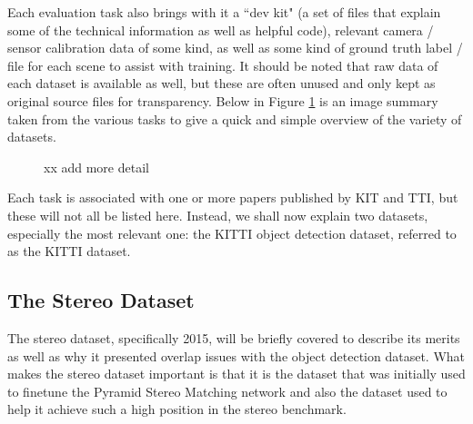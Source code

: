 Each evaluation task also brings with it a ``dev kit" (a set of files that explain some of the technical information as well as helpful code), relevant camera / sensor calibration data of some kind, as well as some kind of ground truth label / file for each scene to assist with training. It should be noted that raw data of each dataset is available as well, but these are often unused and only kept as original source files for transparency. Below in Figure \ref{kitti_samples} is an image summary taken from the various tasks to give a quick and simple overview of the variety of datasets.

\begin{figure}[H]
    \centering
    \caption{xx add more detail}
    \label{kitti_samples}
\end{figure}

Each task is associated with one or more papers published by KIT and TTI, but these will not all be listed here. Instead, we shall now explain two datasets, especially the most relevant one: the KITTI object detection dataset, referred to as the KITTI dataset.

\subsection{The Stereo Dataset}
The stereo dataset, specifically 2015, will be briefly covered to describe its merits as well as why it presented overlap issues with the object detection dataset. What makes the stereo dataset important is that it is the dataset that was initially used to finetune the Pyramid Stereo Matching network and also the dataset used to help it achieve such a high position in the stereo benchmark. 

